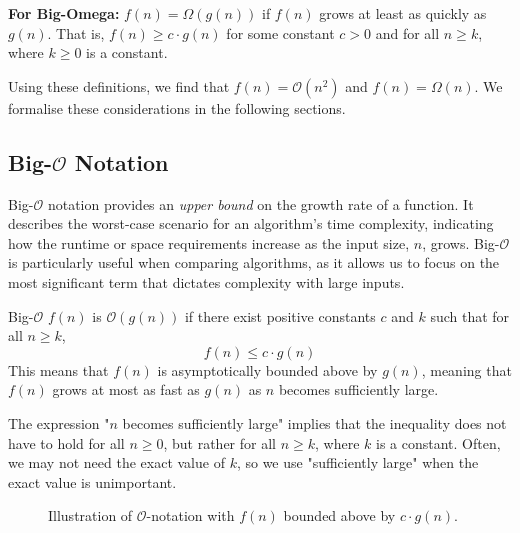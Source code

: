 \textbf{For Big-Omega:} \( f(n) = \Omega(g(n)) \) if \( f(n) \) grows at least as quickly as \( g(n) \). That is, \( f(n) \geq c \cdot g(n) \) for some constant \( c > 0 \) and for all \( n \geq k \), where \( k \geq 0 \) is a constant.

Using these definitions, we find that \( f(n) = \mathcal{O}(n^2) \) and \( f(n) = \Omega(n) \). We formalise these considerations in the following sections.

\subsection*{Big-\texorpdfstring{$\mathcal{O}$}{O} Notation}
Big-$\mathcal{O}$ notation provides an \textit{upper bound} on the growth rate of a function. It describes the worst-case scenario for an algorithm’s time complexity, indicating how the runtime or space requirements increase as the input size, $n$, grows. Big-$\mathcal{O}$ is particularly useful when comparing algorithms, as it allows us to focus on the most significant term that dictates complexity with large inputs.

\begin{definition}{Big-$\mathcal{O}$}
    $f(n)$ is $\mathcal{O}(g(n))$ if there exist positive constants $c$ and $k$ such that for all $n \geq k$,
    \medskip
    \[
    f(n) \leq c \cdot g(n)
    \]
    \medskip
    This means that $f(n)$ is asymptotically bounded above by $g(n)$, meaning that $f(n)$ grows at most as fast as $g(n)$ as $n$ becomes sufficiently large.
    \label{def:big_o_notation}
\end{definition}

The expression "$n$ becomes sufficiently large" implies that the inequality does not have to hold for all $n \geq 0$, but rather for all $n \geq k$, where $k$ is a constant. Often, we may not need the exact value of $k$, so we use "sufficiently large" when the exact value is unimportant.

\begin{figure}[htbp]
    \centering
    \caption{Illustration of \(\mathcal{O}\)-notation with $f(n)$ bounded above by $c \cdot g(n)$.}
    \label{fig:big_o_notation}
\end{figure}

